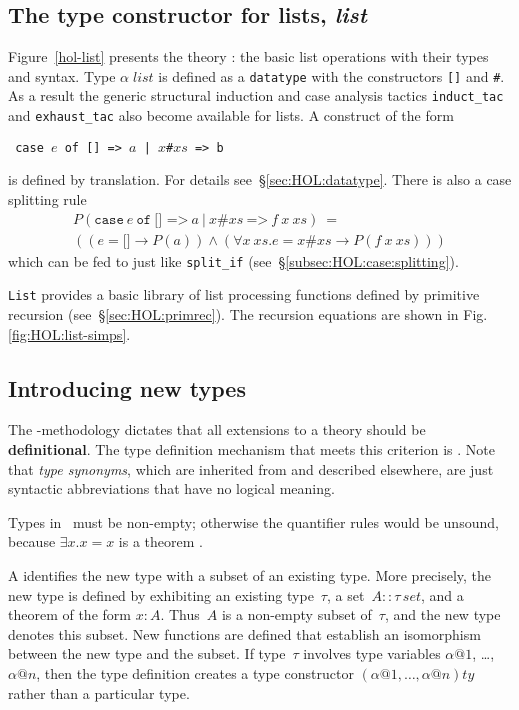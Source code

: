 \subsection{The type constructor for lists, \textit{list}}
\label{subsec:list}

Figure~\ref{hol-list} presents the theory : the basic list
operations with their types and syntax.  Type $\alpha \; list$ is
defined as a \texttt{datatype} with the constructors {\tt[]} and {\tt\#}.
As a result the generic structural induction and case analysis tactics
\texttt{induct\_tac} and \texttt{exhaust\_tac} also become available for
lists.  A  construct of the form
\begin{center}\tt
case $e$ of [] => $a$  |  \(x\)\#\(xs\) => b
\end{center}
is defined by translation.  For details see~{\S}\ref{sec:HOL:datatype}. There
is also a case splitting rule 
\[
\begin{array}{l}
P(\mathtt{case}~e~\mathtt{of}~\texttt{[] =>}~a ~\texttt{|}~
               x\texttt{\#}xs~\texttt{=>}~f~x~xs) ~= \\
((e = \texttt{[]} \to P(a)) \land
 (\forall x~ xs. e = x\texttt{\#}xs \to P(f~x~xs)))
\end{array}
\]
which can be fed to  just like
\texttt{split_if} (see~{\S}\ref{subsec:HOL:case:splitting}).

\texttt{List} provides a basic library of list processing functions defined by
primitive recursion (see~{\S}\ref{sec:HOL:primrec}).  The recursion equations
are shown in Fig.\ts\ref{fig:HOL:list-simps}.



\subsection{Introducing new types} \label{sec:typedef}

The \HOL-methodology dictates that all extensions to a theory should
be \textbf{definitional}.  The type definition mechanism that
meets this criterion is .  Note that \emph{type synonyms},
which are inherited from {\Pure} and described elsewhere, are just
syntactic abbreviations that have no logical meaning.

\begin{warn}
  Types in \HOL\ must be non-empty; otherwise the quantifier rules would be
  unsound, because $\exists x. x=x$ is a theorem \cite[{\S}7]{paulson-COLOG}.
\end{warn}
A  identifies the new type with a subset of
an existing type.  More precisely, the new type is defined by
exhibiting an existing type~$\tau$, a set~$A::\tau\,set$, and a
theorem of the form $x:A$.  Thus~$A$ is a non-empty subset of~$\tau$,
and the new type denotes this subset.  New functions are defined that
establish an isomorphism between the new type and the subset.  If
type~$\tau$ involves type variables $\alpha@1$, \ldots, $\alpha@n$,
then the type definition creates a type constructor
$(\alpha@1,\ldots,\alpha@n)ty$ rather than a particular type.

